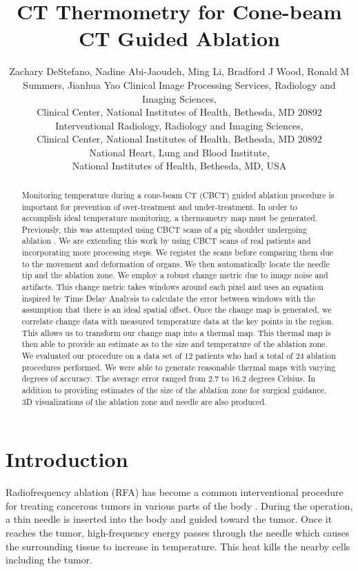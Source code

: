 \documentclass[]{spie}  %
\title{CT Thermometry for Cone-beam CT Guided Ablation}
\author{Zachary DeStefano\supit{a}, Nadine Abi-Jaoudeh\supit{b}, Ming Li\supit{c}, Bradford J Wood\supit{b}, Ronald M Summers\supit{a}, Jianhua Yao\supit{a}
\skiplinehalf
\supit{a}Clinical Image Processing Services, Radiology and Imaging Sciences, \\Clinical Center, National Institutes of Health, Bethesda, MD 20892\\
\supit{b}Interventional Radiology, Radiology and Imaging Sciences, \\Clinical Center, National Institutes of Health, Bethesda, MD 20892\\
\supit{c}National Heart, Lung and Blood Institute, \\National Institutes of Health, Bethesda, MD, USA
}
\begin{document}
 
  \maketitle 

\begin{abstract}

Monitoring temperature during a cone-beam CT (CBCT) guided ablation procedure is important for prevention of over-treatment and under-treatment. In order to accomplish ideal temperature monitoring, a thermometry map must be generated. Previously, this was attempted using CBCT scans of a pig shoulder undergoing ablation \cite{Li13}. We are extending this work by using CBCT scans of real patients and incorporating more processing steps. We register the scans before comparing them due to the movement and deformation of organs. We then automatically locate the needle tip and the ablation zone. We employ a robust change metric due to image noise and artifacts. This change metric takes windows around each pixel and uses an equation inspired by Time Delay Analysis to calculate the error between windows with the assumption that there is an ideal spatial offset. Once the change map is generated, we correlate change data with measured temperature data at the key points in the region. This allows us to transform our change map into a thermal map. This thermal map is then able to provide an estimate as to the size and temperature of the ablation zone. We evaluated our procedure on a data set of 12 patients who had a total of 24 ablation procedures performed. We were able to generate reasonable thermal maps with varying degrees of accuracy. The average error ranged from 2.7 to 16.2 degrees Celsius. In addition to providing estimates of the size of the ablation zone for surgical guidance, 3D visualizations of the ablation zone and needle are also produced. 
\end{abstract}



\section{Introduction}
\label{sec:intro}  %

Radiofrequency ablation (RFA) has become a common interventional procedure for treating cancerous tumors in various parts of the body \cite{Mayo15}. During the operation, a thin needle is inserted into the body and guided toward the tumor. Once it reaches the tumor, high-frequency energy passes through the needle which causes the surrounding tissue to increase in temperature. This heat kills the nearby cells including the tumor. 
\end{document}
